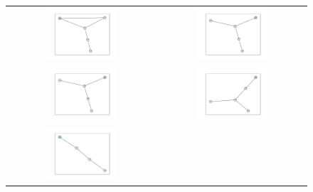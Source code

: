 \documentclass[12pt, a4paper]{extarticle}
\begin{document}
\begin{figure}\centering\begin{tabularx}{\textwidth}{cc}
\includegraphics[width=0.5\textwidth]{task11-graphlets/5_14-13-21-25-23.pdf} &
\includegraphics[width=0.5\textwidth]{task11-graphlets/5_21-20-19-22-23.pdf} \\
\includegraphics[width=0.5\textwidth]{task11-graphlets/5_14-16-18-22-23.pdf} &
\includegraphics[width=0.5\textwidth]{task11-graphlets/5_10-16-17-18-23.pdf} \\
\includegraphics[width=0.5\textwidth]{task11-graphlets/4_10-14-21-23.pdf} &

\end{tabularx}
\end{figure}
\end{document}
